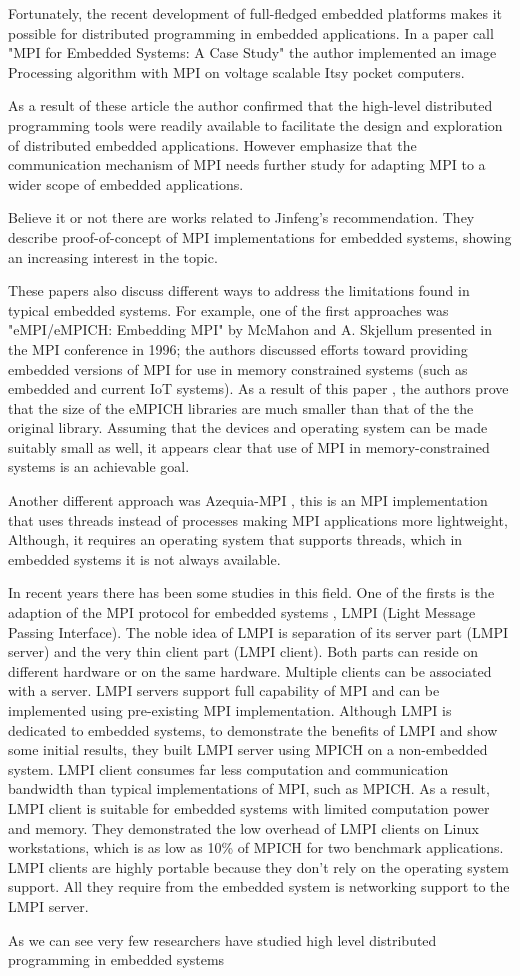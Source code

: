 Fortunately, the recent development of full-fledged embedded platforms makes 
it possible for distributed programming in embedded applications. In a paper
call "MPI for Embedded Systems: A Case Study" the author implemented an image
Processing algorithm with MPI on voltage scalable Itsy pocket computers. 

As a result of these article the author confirmed that the high-level distributed 
programming tools were readily available to facilitate the design and 
exploration of distributed embedded applications. However emphasize that the 
communication mechanism of MPI needs further study for adapting MPI to a wider 
scope of embedded applications.

Believe it or not there are works 
\cite{Saldana} \cite{Gallego} \cite{McMahon} related to Jinfeng's
recommendation. They describe proof-of-concept of MPI implementations for 
embedded systems, showing an increasing interest in the topic. 

These papers also discuss different ways to address the limitations found in 
typical embedded systems. For example, one of the first approaches was 
"eMPI/eMPICH: Embedding MPI" by
McMahon and A. Skjellum presented in the MPI conference in 1996; the authors 
discussed efforts toward providing embedded versions of MPI for use in 
memory constrained systems (such as embedded and
current IoT systems). As a result of this paper , the authors prove that the
size of the eMPICH libraries are much smaller than that of the
the original library. Assuming that the devices  and operating system
can be made suitably small as well, it appears clear that use of MPI in
memory-constrained systems is an achievable goal.

Another different approach was Azequia-MPI \cite{Gallego}, this is an MPI 
implementation that uses threads instead of processes making MPI applications 
more lightweight, Although, it requires an operating system that supports 
threads, which in embedded systems it is not always available. 

In recent years there has been some studies in this field. One of the
firsts is the adaption of the MPI protocol for embedded systems , LMPI
\cite{Liu} (Light Message Passing Interface). The noble idea of LMPI is
separation of its server part (LMPI server) and the very thin client part (LMPI
client). Both parts can reside on different hardware or on the same hardware.
Multiple clients can be associated with a server. LMPI servers support full
capability of MPI and can be implemented using pre-existing MPI implementation.
Although LMPI is dedicated to embedded systems, to demonstrate the benefits of
LMPI and show some initial results, they built LMPI server using MPICH on a
non-embedded system. LMPI client consumes far less computation and
communication
bandwidth than typical implementations of MPI, such as MPICH. As a result, LMPI
client is suitable for embedded systems with limited computation power and
memory. They demonstrated the low overhead of LMPI clients on Linux
workstations, which is as low as 10\% of MPICH for two benchmark applications.
LMPI clients are highly portable because they don't rely on the operating
system
support. All they require from the embedded system is networking support to the
LMPI server.

As we can see very few researchers have studied high level distributed programming
in embedded systems

\newpage

\clearpage
